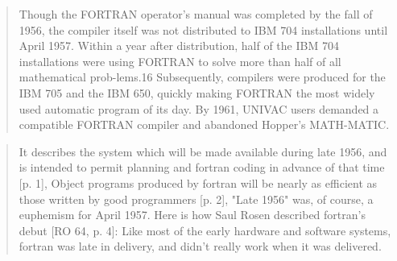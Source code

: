 
  \begin{quotation}
    Though the FORTRAN operator's manual was completed by the fall of 1956, the
    compiler itself was not distributed to IBM 704 installations
    until April 1957.
    Within a year after distribution, half of the IBM 704
    installations were using
    FORTRAN to solve more than half of all mathematical prob-lems.16
    Subsequently,
    compilers were produced for the IBM 705 and the IBM 650, quickly
    making FORTRAN
    the most widely used automatic program of its day. By 1961, UNIVAC users
    demanded a compatible FORTRAN compiler and abandoned Hopper's MATH-MATIC.
    \cite{grace_hopper_and_the_invention_of_the_information_age_2009}
  \end{quotation}

  \begin{quotation}
    It describes the system which will be made available during late
    1956, and is
    intended to permit planning and fortran coding in advance of that
    time [p. 1],
    Object programs produced by fortran will be nearly as efficient as those
    written by good programmers [p. 2], "Late 1956" was, of course, a
    euphemism for
    April 1957. Here is how Saul Rosen described fortran's debut [RO
    64, p. 4]: Like
    most of the early hardware and software systems, fortran was late
    in delivery,
    and didn't really work when it was delivered.
    \cite{history_of_computing_in_the_twentieth_century_1980}
  \end{quotation}

